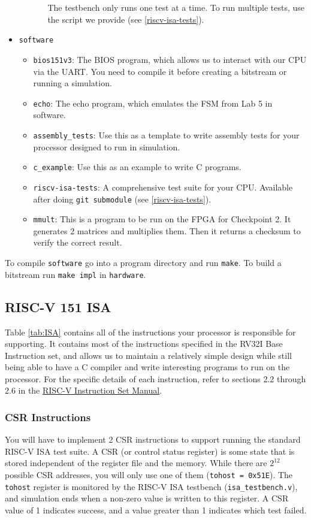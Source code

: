 \documentclass[11pt]{article}
\begin{document}
\begin{itemize}
\begin{itemize}
\begin{itemize}
The testbench only runs one test at a time. To run multiple tests, use the script we provide (see \ref{riscv-isa-tests}).
        \end{itemize}
    \end{itemize}
  \item \texttt{software}
    \begin{itemize}
      \item \verb|bios151v3|: The BIOS program, which allows us to interact with our CPU via the UART. You need to compile it before creating a bitstream or running a simulation.
      \item \verb|echo|: The echo program, which emulates the FSM from Lab 5 in software.
      \item \verb|assembly_tests|: Use this as a template to write assembly tests for your processor designed to run in simulation.
      \item \verb|c_example|: Use this as an example to write C programs.
      \item \verb|riscv-isa-tests|: A comprehensive test suite for your CPU. Available after doing \verb|git submodule| (see \ref{riscv-isa-tests}).
      \item \verb|mmult|: This is a program to be run on the FPGA for Checkpoint 2. It generates 2 matrices and multiplies them. Then it returns a checksum to verify the correct result.
    \end{itemize}
\end{itemize}

To compile \texttt{software} go into a program directory and run \texttt{make}.
To build a bitstream run \texttt{make impl} in \texttt{hardware}.

\subsection{RISC-V 151 ISA}
Table \ref{tab:ISA} contains all of the instructions your processor is responsible for supporting.
It contains most of the instructions specified in the RV32I Base Instruction set, and allows us to maintain a relatively simple design while still being able to have a C compiler and write interesting programs to run on the processor.
For the specific details of each instruction, refer to sections 2.2 through 2.6 in the \href{http://riscv.org/specifications/}{RISC-V Instruction Set Manual}.

\subsubsection{CSR Instructions}
You will have to implement 2 CSR instructions to support running the standard RISC-V ISA test suite.
A CSR (or control status register) is some state that is stored independent of the register file and the memory.
While there are $2^{12}$ possible CSR addresses, you will only use one of them (\texttt{tohost = 0x51E}).
The \texttt{tohost} register is monitored by the RISC-V ISA testbench (\verb|isa_testbench.v|), and simulation ends when a non-zero value is written to this register.
A CSR value of 1 indicates success, and a value greater than 1 indicates which test failed.
\end{document}
